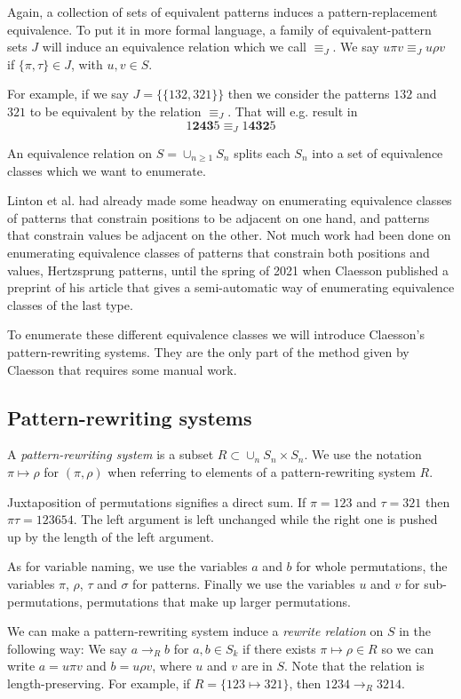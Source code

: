 \documentclass[a4paper, 11pt, english]{article}
\newcommand{\patternrule}{ \mapsto \!}
\theoremstyle{definition}
\newcommand{\Sym}{S}
\begin{document}
Again, a collection of sets of equivalent patterns induces a pattern-replacement equivalence.
To put it in more formal language, a family of equivalent-pattern sets $J$ will induce an equivalence relation
which we call $\equiv_J$. We say $u \pi v \equiv_J u \rho v$ if $\{ \pi, \tau \} \in J$, with $u,v
\in \Sym$.

For example, if we say $J = \{ \{ 132, 321 \} \}$ then we consider the patterns $132$ and $321$ to
be equivalent by the relation $\equiv_J$. That will e.g. result in
\[
    1\bm{243}5 \equiv_J 1\bm{432}5
\]

An equivalence relation on $\Sym = \cup_{n \geq 1} \Sym_n$ splits each $\Sym_n$
into a set of equivalence classes which we want to enumerate. 

Linton et al. had already made some headway on enumerating equivalence classes of patterns that constrain
positions to be adjacent on one hand, and patterns that constrain values be adjacent on the other.
Not much work had been done on enumerating equivalence classes of patterns that constrain both
positions and values, Hertzsprung patterns, until the spring of 2021 when Claesson published a
preprint of his article \cite{claesson:2021} that gives a semi-automatic way of enumerating equivalence classes of the
last type.

To enumerate these different equivalence classes we will introduce Claesson's 
pattern-rewriting systems. They are the only part of the method given by Claesson that requires
some manual work. 

\subsection{Pattern-rewriting systems}
A \emph{pattern-rewriting system} is a subset $R \subset \cup_{n} \Sym_n \times \Sym_n$.
We use the notation $\pi \patternrule \rho$ for $(\pi, \rho)$ when referring
to elements of a pattern-rewriting system $R$. 

Juxtaposition of permutations signifies a direct sum. If $\pi=123$ and
$\tau=321$ then $\pi\tau=123654$. The left argument is left unchanged while the
right one is pushed up by the length of the left argument.

As for variable naming, we use the variables $a$ and $b$ for whole permutations, 
the variables $\pi$, $\rho$, $\tau$ and $\sigma$ for patterns.
Finally we use the variables $u$ and $v$ for sub-permutations, permutations that make up larger
permutations.

We can make a pattern-rewriting system induce a \emph{rewrite relation} on $\Sym$ in the following way: We say
$a \to_R b$ for $a, b \in \Sym_k$ if there exists $\pi \patternrule \rho \in R$ so
we can write $a = u \pi v$ and $b = u \rho v$, where
$u$ and $v$ are in $\Sym$.  Note that the relation is
length-preserving. For example, if $R = \{123 \patternrule 321\}$, then $1234 \to_R 3214$. 
\end{document}
